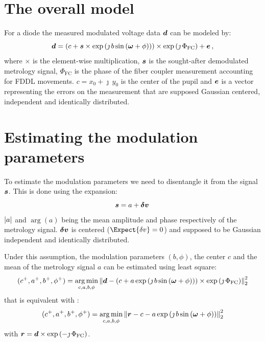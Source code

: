 \documentclass[a4paper,11pt,twoside]{scrartcl}
\begin{document}
\section{The overall model}
For a  diode the measured modulated voltage data $\boldsymbol{d}$ can be modeled by:
\begin{equation}
    \boldsymbol{d} = \left( c + \boldsymbol{s} \times  \exp\left( \jmath \, b \sin\left( \boldsymbol{\omega} + \phi\right)\right)\right)\times\exp\left(\jmath\,\Phi_\textrm{FC}\right)+  \boldsymbol{e}\,,\label{eq:model}
\end{equation}
where $\times$ is the element-wise multiplication, $\boldsymbol{s}$ is the sought-after demodulated  metrology signal, $\Phi_\textrm{FC}$ is the phase of the fiber coupler measurement accounting for FDDL movements. $c  = x_0 + \jmath\,y_0$ is the center of the pupil and $\boldsymbol{e}$ is a vector representing the errors on the measurement that are supposed Gaussian centered, independent and identically distributed.



\section{ Estimating the modulation parameters}

To estimate the modulation parameters we need to disentangle it from the signal  $\boldsymbol{s}$. This is done using the expansion:
\begin{equation}
    \boldsymbol{s} = a  + \boldsymbol{\delta v}\,
\end{equation}
$\vert a\vert$  and $\arg{(a)}$ being the  mean amplitude and phase respectively of the metrology signal.  $ \boldsymbol{\delta v}$ is centered ($\Expect{\delta v}= 0$)  and supposed to be Gaussian independent and identically distributed.

Under this assumption, the modulation parameters $( b, \phi)$, the center $c$ and the mean of the metrology signal $a$ can be estimated using least square:
\begin{equation}
    (c^+, a^+, b^+, \phi^+) = \argmin_{c,a,b,\phi} \Norm{\V{d} -  \left(c + a \exp\left( \jmath \, b \sin\left( \V{\omega} + \phi\right)\right)\right)\times\exp\left(\jmath\,\Phi_\textrm{FC}\right) }_2^2
\end{equation}
that is equivalent with : 
\begin{equation}
    (c^+, a^+, b^+, \phi^+) = \argmin_{c,a,b,\phi} \Norm{\V{r} -  c - a \exp\left( \jmath \, b \sin\left( \V{\omega} + \phi\right)\right) }_2^2\label{eq:r}
\end{equation}
with $\boldsymbol{r} =\boldsymbol{d}\times\exp\left(-\jmath\,\Phi_\textrm{FC}\right)$.
\end{document}
